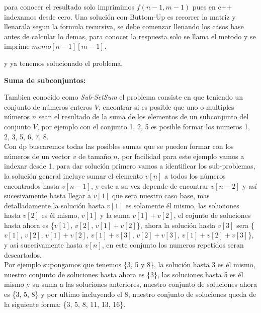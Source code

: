 \documentclass[12pt, a4paper]{article}
\newcommand\cppfile[2][]{

}
\newcommand{\subtitulo}[1]{\begin{center}\textbf{#1}\end{center}}
\begin{document}
	para conocer el resultado solo imprimimos $f(n-1, m-1)$  pues en c++ indexamos desde cero. Una solución con
	Buttom-Up es recorrer la matriz y llenarala segun la formula recursiva, se debe comenzar llenando los casos
	base antes de calcular lo demas, para conocer la respuesta solo se llama el metodo y se imprime 
	$memo[n-1][m-1]$.
	\cppfile[22-35]{codigos/matriz.cpp}
	y ya tenemos solucionado el problema.\\
	
	\subtitulo{Suma de subconjuntos:}
	
	Tambien conocido como \textit{Sub-SetSum} el problema consiste en que teniendo un conjunto de números enteros
	$V$, encontrar si es posible que uno o multiples números $n$ sean el resultado de la suma de los elementos
	de un subconjunto del conjunto $V$, por ejemplo con el conjunto {1, 2, 5} es posible formar los numeros
	{1, 2, 3, 5, 6, 7, 8}.\\
	
	Con dp buscaremos todas las posibles sumas que se pueden formar con los números de un vector $v$ de tamaño $n$,
	por facilidad para este ejemplo vamos a indexar desde 1, para dar solución primero vamos a identificar los
	sub-problemas, la solución general incluye sumar el elemento $v[n]$ a todos los números encontrados
	hasta $v[n-1]$, y este a su vez depende de encontrar $v[n-2]$ y así sucesivamente hasta llegar a $v[1]$
	que sera nuestro caso base, mas detalladamente la solución hasta $v[1]$ es solamente él mismo, las soluciones
	hasta $v[2]$ es él mismo, $v[1]$ y la suma $v[1]+v[2]$, el cojunto de soluciones hasta ahora es
	\{$v[1]$, $v[2]$, $v[1]+v[2]$\}, ahora la solución hasta $v[3]$ sera
	\{$v[1]$, $v[2]$, $v[1]+v[2]$, $v[1]+v[3]$, $v[2]+v[3]$, $v[1]+v[2]+v[3]$\}, y así sucesivamente hasta $v[n]$,
	en este conjunto los numeros repetidos seran descartados.\\
	
	Por ejemplo supongamos que tenemos \{3, 5 y 8\}, la solución hasta 3 es él mismo, nuestro conjunto de soluciones hasta
	ahora es \{3\}, las soluciones hasta 5 es él mismo y su suma a las soluciones anteriores, nuestro conjunto de
	soluciones ahora es \{3, 5, 8\} y por ultimo incluyendo el 8, nuestro conjunto de soluciones queda de la siguiente
	forma: \{3, 5, 8, 11, 13, 16\}.\\
	
\end{document}
